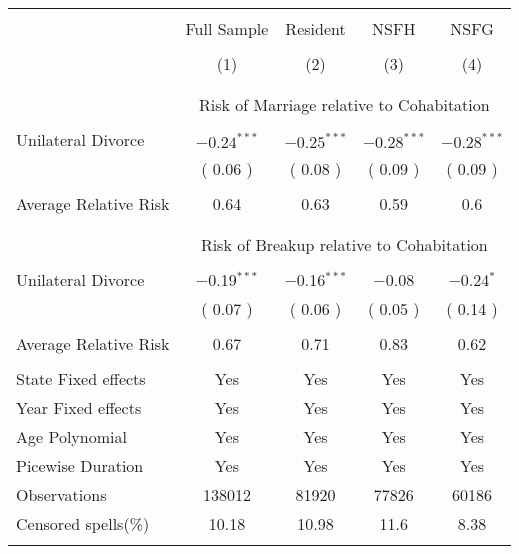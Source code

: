 \footnotesize 
\begin{tabular}{@{\extracolsep{5pt}}lcccc} 
\\[-1.8ex]\hline 
\hline 
\\[-1.8ex] & \multicolumn{1}{c}{Full Sample} & \multicolumn{1}{c}{Resident}& \multicolumn{1}{c}{NSFH}& \multicolumn{1}{c}{NSFG} \\ 
\\[-1.8ex] & \multicolumn{1}{c}{(1)} & \multicolumn{1}{c}{(2)} & \multicolumn{1}{c}{(3)} & \multicolumn{1}{c}{(4)}\\ 
\hline \\[-1.8ex] 
\\[-2.2ex] & \multicolumn{4}{c}{Risk of Marriage relative to Cohabitation} \\  
 \hline \\[-1.8ex]
 Unilateral Divorce &  $-0.24^{***}$  &  $-0.25^{***}$  &  $-0.28^{***}$  &  $-0.28^{***}$  \\ 
  & ( 0.06 ) & ( 0.08 ) & ( 0.09 ) & ( 0.09 ) \\  
 \hline \\[-1.8ex]
 Average Relative Risk &  0.64  &  0.63  &  0.59  &  0.6  \\ 
 \hline \\[-1.8ex]
 \\[-2.2ex] & \multicolumn{4}{c}{Risk of Breakup relative to Cohabitation} \\  
 \hline \\[-1.8ex]
 Unilateral Divorce &  $-$0.19$^{***}$  &  $-$0.16$^{***}$  &  $-$0.08  &  $-$0.24$^{*}$  \\ 
  & ( 0.07 ) & ( 0.06 ) & ( 0.05 ) & ( 0.14 ) \\  
 \hline \\[-1.8ex]
 Average Relative Risk &  0.67  &  0.71  &  0.83  &  0.62  \\ 
 \hline \\[-1.8ex]
State Fixed effects & Yes & Yes & Yes & Yes \\ 
Year Fixed effects & Yes & Yes & Yes & Yes \\ 
Age Polynomial & Yes & Yes & Yes & Yes \\
Picewise Duration & Yes & Yes & Yes & Yes \\ 
\hline
Observations & \multicolumn{1}{c}{ 138012 } & \multicolumn{1}{c}{ 81920 } & \multicolumn{1}{c}{ 77826 } & \multicolumn{1}{c}{ 60186 } \\ 
\hline
Censored spells(\%) & \multicolumn{1}{c}{ 10.18 } & \multicolumn{1}{c}{ 10.98 } & \multicolumn{1}{c}{ 11.6 } & \multicolumn{1}{c}{ 8.38 } \\ 
\hline 
\hline \\[-1.8ex] 
\end{tabular}
